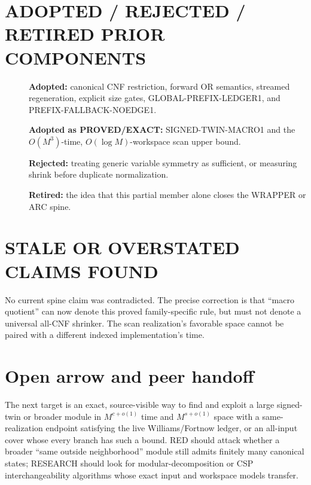 \documentclass[11pt]{article}
\begin{document}
\section{ADOPTED / REJECTED / RETIRED PRIOR COMPONENTS}
\begin{description}
\item[] \textbf{Adopted:} canonical CNF restriction, forward OR semantics,
streamed regeneration, explicit size gates, GLOBAL-PREFIX-LEDGER1, and
PREFIX-FALLBACK-NOEDGE1.
\item[] \textbf{Adopted as PROVED/EXACT:} SIGNED-TWIN-MACRO1 and the
$O(M^3)$-time, $O(\log M)$-workspace scan upper bound.
\item[] \textbf{Rejected:} treating generic variable symmetry as sufficient,
or measuring shrink before duplicate normalization.
\item[] \textbf{Retired:} the idea that this partial member alone closes the
WRAPPER or ARC spine.
\end{description}

\section{STALE OR OVERSTATED CLAIMS FOUND}
No current spine claim was contradicted.  The precise correction is that
``macro quotient'' can now denote this proved family-specific rule, but must
not denote a universal all-CNF shrinker.  The scan realization's favorable
space cannot be paired with a different indexed implementation's time.

\section{Open arrow and peer handoff}
The next target is an exact, source-visible way to find and exploit a
large signed-twin or broader module in $M^{c+o(1)}$ time and
$M^{s+o(1)}$ space with a same-realization endpoint satisfying the live
Williams/Fortnow ledger, or an all-input cover whose every branch has such a
bound.  RED should attack whether a broader ``same outside neighborhood''
module still admits finitely many canonical states; RESEARCH should look for
modular-decomposition or CSP interchangeability algorithms whose exact input
and workspace models transfer.



\end{document}
